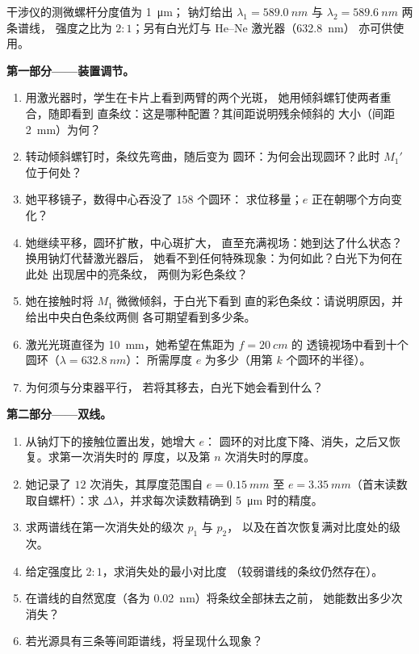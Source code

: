\begin{problem}
\label{pb:b2:michelson:1}

干涉仪的测微螺杆分度值为 \qty{1}{\micro m}；
钠灯给出 $\lambda_1 = \qty{589.0}{nm}$ 与 $\lambda_2 = \qty{589.6}{nm}$ 两条谱线，
强度之比为 $2 : 1$；另有白光灯与 He--Ne 激光器（\qty{632.8}{nm}）
亦可供使用。

\medskip
\noindent\textbf{第一部分——装置调节。}
\begin{enumerate}
  \item 用激光器时，学生在卡片上看到两臂的两个光斑，
        她用倾斜螺钉使两者重合，随即看到
        直条纹：这是哪种配置？其间距说明残余倾斜的
        大小（间距 \qty{2}{mm}）为何？
  \item 转动倾斜螺钉时，条纹先弯曲，随后变为
        圆环：为何会出现圆环？此时 $M_1'$ 位于何处？
  \item 她平移镜子，数得中心吞没了 $158$ 个圆环：
        求位移量；$e$ 正在朝哪个方向变化？
  \item 她继续平移，圆环扩散，中心斑扩大，
        直至充满视场：她到达了什么状态？换用钠灯代替激光器后，
        她看不到任何特殊现象：为何如此？白光下为何在此处
        出现居中的亮条纹，
        两侧为彩色条纹？
  \item 她在接触时将 $M_1$ 微微倾斜，于白光下看到
        直的彩色条纹：请说明原因，并给出中央白色条纹两侧
        各可期望看到多少条。
  \item 激光光斑直径为 \qty{10}{mm}，她希望在焦距为 $f = \qty{20}{cm}$ 的
        透镜视场中看到十个圆环（$\lambda = \qty{632.8}{nm}$）：
        所需厚度 $e$ 为多少（用第 $k$ 个圆环的半径）。
  \item 为何须与分束器平行，
        若将其移去，白光下她会看到什么？
\end{enumerate}

\medskip
\noindent\textbf{第二部分——双线。}
\begin{enumerate}[resume]
  \item 从钠灯下的接触位置出发，她增大 $e$：
        圆环的对比度下降、消失，之后又恢复。求第一次消失时的
        厚度，以及第 $n$ 次消失时的厚度。
  \item 她记录了 $12$ 次消失，其厚度范围自 $e = \qty{0.15}{mm}$ 至
        $e = \qty{3.35}{mm}$（首末读数取自螺杆）：求
        $\Delta\lambda$，并求每次读数精确到 \qty{5}{\micro m} 时的精度。
  \item 求两谱线在第一次消失处的级次 $p_1$ 与 $p_2$，
        以及在首次恢复满对比度处的级次。
  \item 给定强度比 $2 : 1$，求消失处的最小对比度
        （较弱谱线的条纹仍然存在）。
  \item 在谱线的自然宽度（各为 \qty{0.02}{nm}）将条纹全部抹去之前，
        她能数出多少次消失？
  \item 若光源具有三条等间距谱线，将呈现什么现象？
\end{enumerate}


\end{problem}
